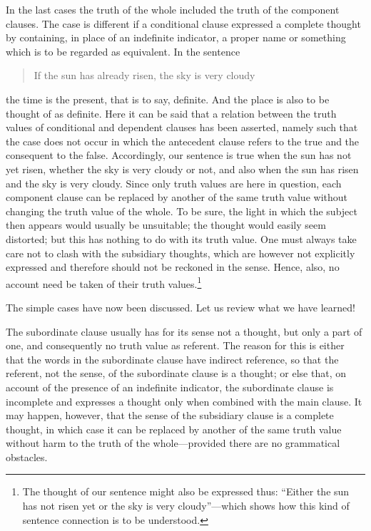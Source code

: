 \documentclass[twoside,12pt]{article}
\begin{document}
In the last cases the truth of the whole included the truth of the
component clauses. The case is different if a conditional clause
expressed a complete thought by containing, in place of an indefinite
indicator, a proper name or something which is to be regarded as
equivalent. In the sentence

\begin{quote}
  If the sun has already risen, the sky is very cloudy
\end{quote}

\noindent the time is the present, that is to say, definite. And the
place is also to be thought of as definite. Here it can be said that a
relation between the truth values of conditional and dependent clauses
has been asserted, namely such that the case does not occur in which
the antecedent clause refers to the true and the consequent to the
false. Accordingly, our sentence is true when the sun has not yet
risen, whether the sky is very cloudy or not, and also when the sun
has risen and the sky is very cloudy. Since only truth values are here
in question, each component clause can be replaced by another of the
same truth value without changing the truth value of the whole. To be
sure, the light in which the subject then appears would usually be
unsuitable; the  thought would easily seem distorted;
but this has nothing to do with its truth value. One must always take
care not to clash with the subsidiary thoughts, which are however not
explicitly expressed and therefore should not be reckoned in the
sense. Hence, also, no account need be taken of their truth
values.\footnote[13]{The thought of our sentence might also be
  expressed thus: ``Either the sun has not risen yet or the sky is
  very cloudy''---which shows how this kind of sentence connection is to
  be understood.}

The simple cases have now been discussed. Let us review what we have
learned!

The subordinate clause usually has for its sense not a thought, but
only a part of one, and consequently no truth value as referent. The
reason for this is either that the words in the subordinate clause
have indirect reference, so that the referent, not the sense, of the
subordinate clause is a thought; or else that, on account of the
presence of an indefinite indicator, the subordinate clause is
incomplete and expresses a thought only when combined with the main
clause. It may happen, however, that the sense of the subsidiary
clause is a complete thought, in which case it can be replaced by
another of the same truth value without harm to the truth of the
whole---provided there are no grammatical obstacles.
\end{document}
